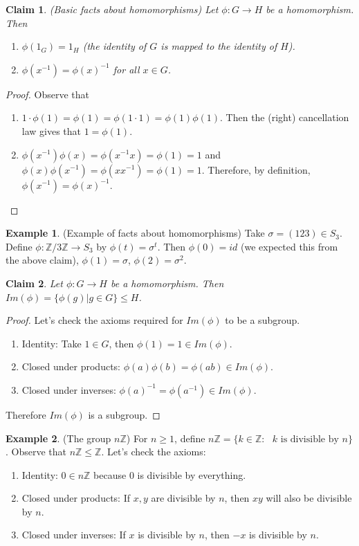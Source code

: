 \documentclass[12pt]{article}
\newtheorem{claim}{Claim}
\theoremstyle{definition}
\newtheorem{example}{Example}
\theoremstyle{definition}
\begin{document}
\begin{claim}(Basic facts about homomorphisms)
Let $\phi : G \to H$ be a homomorphism. Then
\begin{enumerate}
	\item $\phi(1_G) = 1_H$ (the identity of $G$ is mapped to the identity of $H$).
	\item $\phi(x^{-1}) = \phi(x)^{-1}$ for all $x \in G$.
\end{enumerate}
\end{claim}
\begin{proof}
Observe that
\begin{enumerate}
	\item $1 \cdot \phi(1) = \phi(1) = \phi(1 \cdot 1) = \phi(1)\phi(1)$. Then the (right) cancellation law gives that $1 = \phi(1)$.
	\item $\phi(x^{-1})\phi(x) = \phi(x^{-1}x) = \phi(1) = 1$ and $\phi(x)\phi(x^{-1}) = \phi(xx^{-1}) = \phi(1) = 1$. Therefore, by definition, $\phi(x^{-1}) = \phi(x)^{-1}$.
\end{enumerate}
\end{proof}

\begin{example}(Example of facts about homomorphisms)
Take $\sigma = (1 2 3) \in S_3$. Define $\phi : \mathbb{Z} / 3 \mathbb{Z} \to S_3$ by $\phi(t) = \sigma^t$. Then $\phi(0) = id$ (we expected this from the above claim), $\phi(1) = \sigma$, $\phi(2) = \sigma^2$. 
\end{example}

\begin{claim}
Let $\phi : G \to H$ be a homomorphism. Then $Im(\phi) = \{ \phi(g) | g \in G \} \leq H$.
\end{claim}
\begin{proof}
Let's check the axioms required for $Im(\phi)$ to be a subgroup.
\begin{enumerate}
	\item Identity: Take $1 \in G$, then $\phi(1) = 1 \in Im(\phi)$.
	\item Closed under products: $\phi(a)\phi(b) = \phi(ab) \in Im(\phi)$.
	\item Closed under inverses: $\phi(a)^{-1} = \phi(a^{-1}) \in Im(\phi)$.
\end{enumerate}
Therefore $Im(\phi)$ is a subgroup.
\end{proof}

\begin{example}(The group $n \mathbb{Z}$)
For $n \geq 1$, define $n \mathbb{Z} = \{ k \in \mathbb{Z} : \text{ $k$ is divisible by $n$} \}$. Observe that $n \mathbb{Z} \leq \mathbb{Z}$. Let's check the axioms:
\begin{enumerate}
	\item Identity: $0 \in n \mathbb{Z}$ because $0$ is divisible by everything. 
	\item Closed under products: If $x,y$ are divisible by $n$, then $xy$ will also be divisible by $n$.
	\item Closed under inverses: If $x$ is divisible by $n$, then $-x$ is divisible by $n$.
\end{enumerate}
\end{example}
\end{document}
